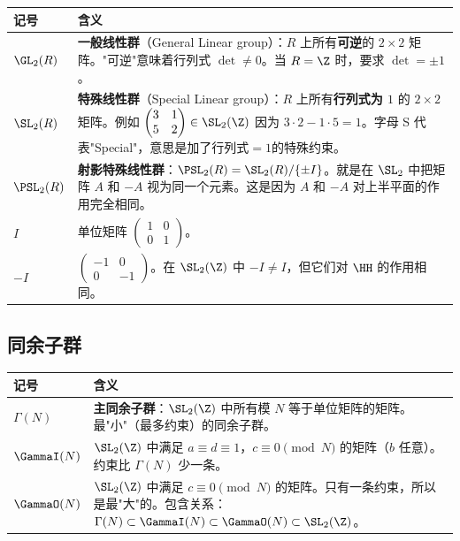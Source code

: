 \begin{longtable}{@{}p{3.5cm}p{10cm}@{}}
\toprule
\textbf{记号} & \textbf{含义} \\
\midrule
$\GL_2(R)$ &
  \textbf{一般线性群}（General Linear group）：$R$ 上所有\textbf{可逆}的 $2\times 2$ 矩阵。"可逆"意味着行列式 $\det \neq 0$。当 $R = \Z$ 时，要求 $\det = \pm 1$。 \\[4pt]
$\SL_2(R)$ &
  \textbf{特殊线性群}（Special Linear group）：$R$ 上所有\textbf{行列式为 $1$} 的 $2\times 2$ 矩阵。例如 $\begin{pmatrix} 3 & 1 \\ 5 & 2 \end{pmatrix} \in \SL_2(\Z)$ 因为 $3 \cdot 2 - 1 \cdot 5 = 1$。字母 S 代表"Special"，意思是加了行列式$=1$的特殊约束。 \\[4pt]
$\PSL_2(R)$ &
  \textbf{射影特殊线性群}：$\PSL_2(R) = \SL_2(R) / \{\pm I\}$。就是在 $\SL_2$ 中把矩阵 $A$ 和 $-A$ 视为同一个元素。这是因为 $A$ 和 $-A$ 对上半平面的作用完全相同。 \\[4pt]
$I$ &
  单位矩阵 $\begin{pmatrix} 1 & 0 \\ 0 & 1 \end{pmatrix}$。 \\[4pt]
$-I$ &
  $\begin{pmatrix} -1 & 0 \\ 0 & -1 \end{pmatrix}$。在 $\SL_2(\Z)$ 中 $-I \neq I$，但它们对 $\HH$ 的作用相同。 \\
\bottomrule
\end{longtable}

\subsection*{同余子群}

\begin{longtable}{@{}p{3.5cm}p{10cm}@{}}
\toprule
\textbf{记号} & \textbf{含义} \\
\midrule
$\Gamma(N)$ &
  \textbf{主同余子群}：$\SL_2(\Z)$ 中所有模 $N$ 等于单位矩阵的矩阵。最"小"（最多约束）的同余子群。 \\[4pt]
$\GammaI(N)$ &
  $\SL_2(\Z)$ 中满足 $a \equiv d \equiv 1$，$c \equiv 0 \pmod{N}$ 的矩阵（$b$ 任意）。约束比 $\Gamma(N)$ 少一条。 \\[4pt]
$\GammaO(N)$ &
  $\SL_2(\Z)$ 中满足 $c \equiv 0 \pmod{N}$ 的矩阵。只有一条约束，所以是最"大"的。包含关系：$\Gamma(N) \subset \GammaI(N) \subset \GammaO(N) \subset \SL_2(\Z)$。 \\
\bottomrule
\end{longtable}

